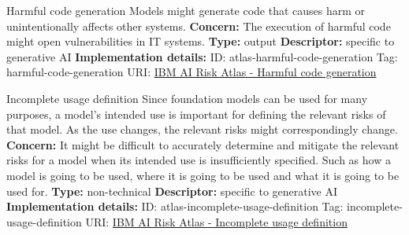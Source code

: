 \documentclass[a4paper,12pt]{article}
\begin{document}
\begin{definitionbox}{Harmful code generation}
Models might generate code that causes harm or unintentionally affects other systems.\newline\newline
\textbf{Concern: }The execution of harmful code might open vulnerabilities in IT systems.\newline\newline
\textbf{Type: }output\newline
\textbf{Descriptor: }specific to generative AI \newline\newline
\textbf{Implementation details: } \newline
ID: atlas-harmful-code-generation \newline
Tag: harmful-code-generation \newline
URI:  \href{https://www.ibm.com/docs/en/watsonx/saas?topic=SSYOK8/wsj/ai-risk-atlas/harmful-code-generation.html}{IBM AI Risk Atlas - Harmful code generation}\newline
\end{definitionbox}
\begin{definitionbox}{Incomplete usage definition}
Since foundation models can be used for many purposes, a model's intended use is important for defining the relevant risks of that model. As the use changes, the relevant risks might correspondingly change.\newline\newline
\textbf{Concern: }It might be difficult to accurately determine and mitigate the relevant risks for a model when its intended use is insufficiently specified. Such as how a model is going to be used, where it is going to be used and what it is going to be used for.\newline\newline
\textbf{Type: }non-technical\newline
\textbf{Descriptor: }specific to generative AI \newline\newline
\textbf{Implementation details: } \newline
ID: atlas-incomplete-usage-definition \newline
Tag: incomplete-usage-definition \newline
URI:  \href{https://www.ibm.com/docs/en/watsonx/saas?topic=SSYOK8/wsj/ai-risk-atlas/incomplete-usage-definition.html}{IBM AI Risk Atlas - Incomplete usage definition}\newline
\end{definitionbox}
\end{document}
